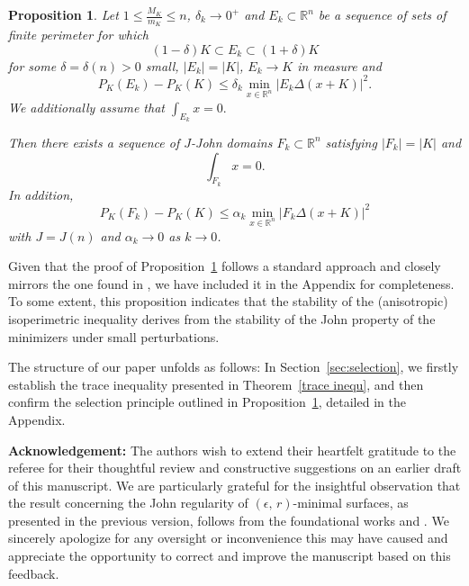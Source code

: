 \documentclass[reqno,11pt]{amsart}
\makeatletter
\def\az{\alpha}
\def\ez{\epsilon}
\newtheorem{prop}[thm]{Proposition}%
\numberwithin{equation}{section}
\theoremstyle{remark}
\makeatother
\begin{document}
 
\begin{prop}\label{selection}
Let $1\le \frac{M_K}{m_K}\le n$, $\delta_k\to 0^+$ and $E_k\subset \mathbb R^n$ be a sequence of sets of finite perimeter for which  
\begin{equation}\label{close to ball}
(1-\delta)K\subset E_k\subset(1+\delta)K 
\end{equation}
for some $\delta=\delta(n)>0$ small, $|E_k|=|K|$, 
$E_k\to K$ in measure and
\begin{equation}\label{assumption}
    P_K(E_k)-P_K(K)\le \delta_k \min_{x\in\mathbb R^n}|E_k\Delta (x+K)|^2.
\end{equation}
We additionally assume that 
$\int_{E_k} x = 0.$

Then there exists a sequence of $J$-John domains $F_k\subset \mathbb R^n$ satisfying $|F_k|=|K|$ and  
\begin{equation}\label{barycond}
    \int_{F_k} x = 0.
\end{equation}
In addition,   
\begin{equation}\label{John selection}
    P_K(F_k)-P_K(K)\le \az_k \min_{x\in\mathbb R^n}|F_k\Delta (x+K)|^2
\end{equation}
with $J=J\left(n\right)$ and $\az_k\to 0$ as $k\to 0$. 
\end{prop}

Given that the proof of Proposition~\ref{selection} follows a standard approach and closely mirrors the one found in \cite[Pages 560-562]{F2015}, we have included it in the Appendix for completeness. To some extent, this proposition indicates that the stability of the (anisotropic) isoperimetric inequality derives from the stability of the John property of the minimizers under small perturbations.


The structure of our paper unfolds as follows:  In Section~\ref{sec:selection}, we firstly establish the trace inequality presented in Theorem~\ref{trace inequ}, and then confirm the selection principle outlined in Proposition~\ref{selection}, detailed in the Appendix.

{\bf Acknowledgement: } The authors wish to extend their heartfelt gratitude to the referee for their thoughtful review and constructive suggestions on an earlier draft of this manuscript. We are particularly grateful for the insightful observation that the result concerning the John regularity of $(\ez,\,r)$-minimal surfaces, as presented in the previous version, follows   from the foundational works \cite{DS1998} and \cite{KKLS2013}. We sincerely apologize for any oversight or inconvenience this may have caused and appreciate the opportunity to correct and improve the manuscript based on this feedback.
\end{document}
